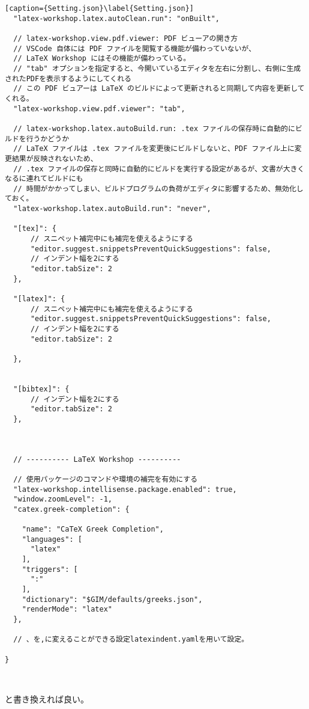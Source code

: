 \documentclass{ltjsarticle}
\begin{document}
\begin{lstlisting}[caption={Setting.json}\label{Setting.json}]
  "latex-workshop.latex.autoClean.run": "onBuilt",

  // latex-workshop.view.pdf.viewer: PDF ビューアの開き方
  // VSCode 自体には PDF ファイルを閲覧する機能が備わっていないが、
  // LaTeX Workshop にはその機能が備わっている。
  // "tab" オプションを指定すると、今開いているエディタを左右に分割し、右側に生成されたPDFを表示するようにしてくれる
  // この PDF ビュアーは LaTeX のビルドによって更新されると同期して内容を更新してくれる。
  "latex-workshop.view.pdf.viewer": "tab",

  // latex-workshop.latex.autoBuild.run: .tex ファイルの保存時に自動的にビルドを行うかどうか
  // LaTeX ファイルは .tex ファイルを変更後にビルドしないと、PDF ファイル上に変更結果が反映されないため、
  // .tex ファイルの保存と同時に自動的にビルドを実行する設定があるが、文書が大きくなるに連れてビルドにも
  // 時間がかかってしまい、ビルドプログラムの負荷がエディタに影響するため、無効化しておく。
  "latex-workshop.latex.autoBuild.run": "never",

  "[tex]": {
      // スニペット補完中にも補完を使えるようにする
      "editor.suggest.snippetsPreventQuickSuggestions": false,
      // インデント幅を2にする
      "editor.tabSize": 2
  },

  "[latex]": {
      // スニペット補完中にも補完を使えるようにする
      "editor.suggest.snippetsPreventQuickSuggestions": false,
      // インデント幅を2にする
      "editor.tabSize": 2
      
  }, 


  "[bibtex]": {
      // インデント幅を2にする
      "editor.tabSize": 2
  },
  


  // ---------- LaTeX Workshop ----------

  // 使用パッケージのコマンドや環境の補完を有効にする
  "latex-workshop.intellisense.package.enabled": true,
  "window.zoomLevel": -1,
  "catex.greek-completion": {
  
    "name": "CaTeX Greek Completion",
    "languages": [
      "latex"
    ],
    "triggers": [
      ":"
    ],
    "dictionary": "$GIM/defaults/greeks.json",
    "renderMode": "latex"
  },

  // 、を,に変えることができる設定latexindent.yamlを用いて設定。

}

  
\end{lstlisting}
と書き換えれば良い。
\end{document}
